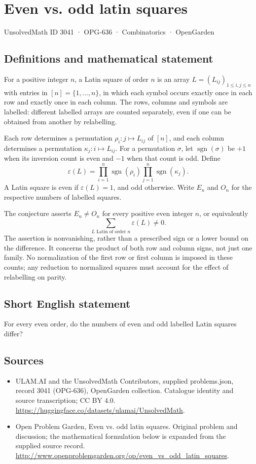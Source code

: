 \documentclass[11pt,a4paper]{article}
\begin{document}
\section*{Even vs. odd latin squares}\label{3041}
{\small UnsolvedMath ID 3041 · OPG-636 · Combinatorics · OpenGarden}
\subsection{Definitions and mathematical statement}
For a positive integer $n$, a Latin square of order $n$ is an array
$L=(L_{ij})_{1\le i,j\le n}$ with entries in $[n]=\{1,\ldots,n\}$, in which
each symbol occurs exactly once in each row and exactly once in each column.
The rows, columns and symbols are labelled: different labelled arrays are
counted separately, even if one can be obtained from another by relabelling.

Each row determines a permutation $\rho_i:j\mapsto L_{ij}$ of $[n]$, and
each column determines a permutation $\kappa_j:i\mapsto L_{ij}$.
For a permutation $\sigma$, let $\operatorname{sgn}(\sigma)$ be $+1$ when
its inversion count is even and $-1$ when that count is odd. Define
\[
 \varepsilon(L)=\prod_{i=1}^n\operatorname{sgn}(\rho_i)
                 \prod_{j=1}^n\operatorname{sgn}(\kappa_j).
\]
A Latin square is even if $\varepsilon(L)=1$, and odd otherwise. Write
$E_n$ and $O_n$ for the respective numbers of labelled squares.

The conjecture asserts $E_n\ne O_n$ for every positive even integer $n$,
or equivalently
\[
 \sum_{L\text{ Latin of order }n}\varepsilon(L)\ne0.
\]
The assertion is nonvanishing, rather than a prescribed sign or a lower
bound on the difference. It concerns the product of both row and column
signs, not just one family. No normalization of the first row or first
column is imposed in these counts; any reduction to normalized squares
must account for the effect of relabelling on parity.
\subsection{Short English statement}
For every even order, do the numbers of even and odd labelled Latin squares differ?
\subsection{Sources}
\begin{itemize}
\item[S1] ULAM.AI and the UnsolvedMath Contributors, supplied problems.json, record 3041 (OPG-636), OpenGarden collection. Catalogue identity and source transcription; CC BY 4.0.
\url{https://huggingface.co/datasets/ulamai/UnsolvedMath}.
\item[S2] Open Problem Garden, Even vs. odd latin squares. Original problem and discussion; the mathematical formulation below is expanded from the supplied source record.
\url{http://www.openproblemgarden.org/op/even_vs_odd_latin_squares}.
\end{itemize}
\end{document}
